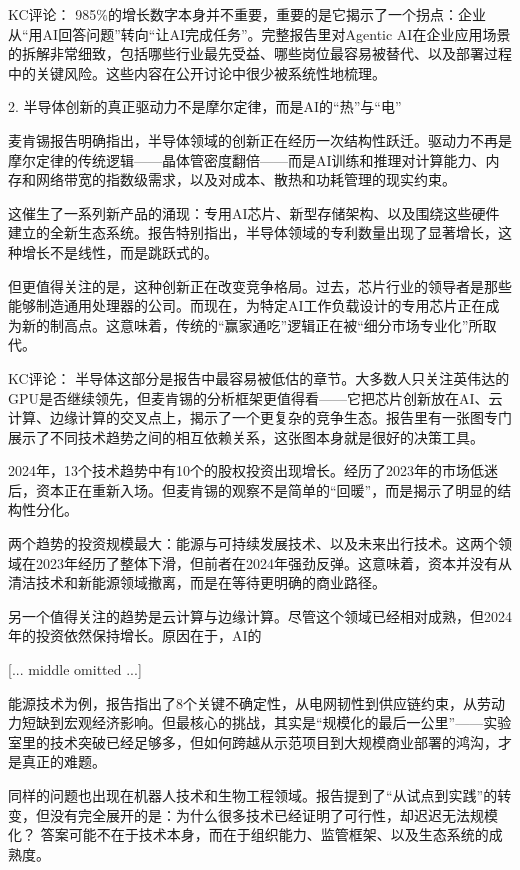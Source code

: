 \documentclass[11pt]{ctexart}
\begin{document}
KC评论： 985\%的增长数字本身并不重要，重要的是它揭示了一个拐点：企业从“用AI回答问题”转向“让AI完成任务”。完整报告里对Agentic AI在企业应用场景的拆解非常细致，包括哪些行业最先受益、哪些岗位最容易被替代、以及部署过程中的关键风险。这些内容在公开讨论中很少被系统性地梳理。

2. 半导体创新的真正驱动力不是摩尔定律，而是AI的“热”与“电”

麦肯锡报告明确指出，半导体领域的创新正在经历一次结构性跃迁。驱动力不再是摩尔定律的传统逻辑——晶体管密度翻倍——而是AI训练和推理对计算能力、内存和网络带宽的指数级需求，以及对成本、散热和功耗管理的现实约束。

这催生了一系列新产品的涌现：专用AI芯片、新型存储架构、以及围绕这些硬件建立的全新生态系统。报告特别指出，半导体领域的专利数量出现了显著增长，这种增长不是线性，而是跳跃式的。

但更值得关注的是，这种创新正在改变竞争格局。过去，芯片行业的领导者是那些能够制造通用处理器的公司。而现在，为特定AI工作负载设计的专用芯片正在成为新的制高点。这意味着，传统的“赢家通吃”逻辑正在被“细分市场专业化”所取代。

KC评论： 半导体这部分是报告中最容易被低估的章节。大多数人只关注英伟达的GPU是否继续领先，但麦肯锡的分析框架更值得看——它把芯片创新放在AI、云计算、边缘计算的交叉点上，揭示了一个更复杂的竞争生态。报告里有一张图专门展示了不同技术趋势之间的相互依赖关系，这张图本身就是很好的决策工具。

2024年，13个技术趋势中有10个的股权投资出现增长。经历了2023年的市场低迷后，资本正在重新入场。但麦肯锡的观察不是简单的“回暖”，而是揭示了明显的结构性分化。

两个趋势的投资规模最大：能源与可持续发展技术、以及未来出行技术。这两个领域在2023年经历了整体下滑，但前者在2024年强劲反弹。这意味着，资本并没有从清洁技术和新能源领域撤离，而是在等待更明确的商业路径。

另一个值得关注的趋势是云计算与边缘计算。尽管这个领域已经相对成熟，但2024年的投资依然保持增长。原因在于，AI的

[... middle omitted ...]

能源技术为例，报告指出了8个关键不确定性，从电网韧性到供应链约束，从劳动力短缺到宏观经济影响。但最核心的挑战，其实是“规模化的最后一公里”——实验室里的技术突破已经足够多，但如何跨越从示范项目到大规模商业部署的鸿沟，才是真正的难题。

同样的问题也出现在机器人技术和生物工程领域。报告提到了“从试点到实践”的转变，但没有完全展开的是：为什么很多技术已经证明了可行性，却迟迟无法规模化？ 答案可能不在于技术本身，而在于组织能力、监管框架、以及生态系统的成熟度。
\end{document}
